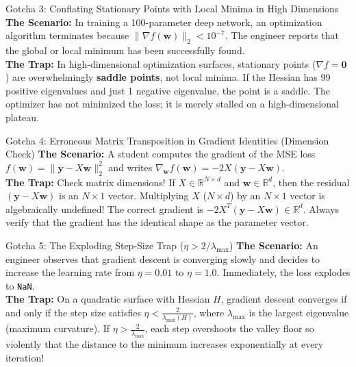 \begin{trapbox}{Gotcha 3: Conflating Stationary Points with Local Minima in High Dimensions}
\textbf{The Scenario:} In training a 100-parameter deep network, an optimization algorithm terminates because $\|\nabla f(\mathbf{w})\|_2 < 10^{-7}$. The engineer reports that the global or local minimum has been successfully found. \\
\textbf{The Trap:} In high-dimensional optimization surfaces, stationary points ($\nabla f = \mathbf{0}$) are overwhelmingly \textbf{saddle points}, not local minima. If the Hessian has 99 positive eigenvalues and just 1 negative eigenvalue, the point is a saddle. The optimizer has not minimized the loss; it is merely stalled on a high-dimensional plateau.
\end{trapbox}

\begin{trapbox}{Gotcha 4: Erroneous Matrix Transposition in Gradient Identities (Dimension Check)}
\textbf{The Scenario:} A student computes the gradient of the MSE loss $f(\mathbf{w}) = \|\mathbf{y} - X\mathbf{w}\|_2^2$ and writes $\nabla_{\mathbf{w}} f(\mathbf{w}) = -2X(\mathbf{y} - X\mathbf{w})$. \\
\textbf{The Trap:} Check matrix dimensions! If $X \in \mathbb{R}^{N \times d}$ and $\mathbf{w} \in \mathbb{R}^d$, then the residual $(\mathbf{y} - X\mathbf{w})$ is an $N \times 1$ vector. Multiplying $X$ ($N \times d$) by an $N \times 1$ vector is algebraically undefined! The correct gradient is $-2X^T (\mathbf{y} - X\mathbf{w}) \in \mathbb{R}^d$. Always verify that the gradient has the identical shape as the parameter vector.
\end{trapbox}

\begin{trapbox}{Gotcha 5: The Exploding Step-Size Trap ($\eta > 2/\lambda_{\max}$)}
\textbf{The Scenario:} An engineer observes that gradient descent is converging slowly and decides to increase the learning rate from $\eta = 0.01$ to $\eta = 1.0$. Immediately, the loss explodes to \texttt{NaN}. \\
\textbf{The Trap:} On a quadratic surface with Hessian $H$, gradient descent converges if and only if the step size satisfies $\eta < \frac{2}{\lambda_{\max}(H)}$, where $\lambda_{\max}$ is the largest eigenvalue (maximum curvature). If $\eta > \frac{2}{\lambda_{\max}}$, each step overshoots the valley floor so violently that the distance to the minimum increases exponentially at every iteration!
\end{trapbox}

